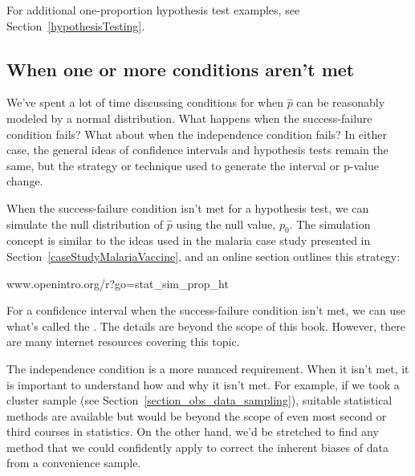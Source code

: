 \oneprophtsummary{}


\noindent%
For additional one-proportion hypothesis test examples,
see Section~\ref{hypothesisTesting}.




\D{\newpage}

\subsection{When one or more conditions aren't met}

We've spent a lot of time discussing conditions for when
$\hat{p}$ can be reasonably modeled by a normal distribution.
What happens when the success-failure condition fails?
What about when the independence condition fails?
In either case, the general ideas of confidence intervals
and hypothesis tests remain the same, but the strategy
or technique used to generate the interval or p-value
change.

When the success-failure condition isn't met
for a hypothesis test, we can simulate the null distribution
of $\hat{p}$ using the null value, $p_0$.
The simulation concept is similar to the ideas used
in the malaria case study presented in
Section~\ref{caseStudyMalariaVaccine},
and an online section outlines this strategy:
\begin{center}
    {www.openintro.org/r?go=stat\_sim\_prop\_ht}
\end{center}
For a confidence interval when the success-failure condition
isn't met, we can use what's called
the .
The details are beyond the scope of this book.
However, there are many internet resources covering
this topic.

The independence condition is a more nuanced requirement.
When it isn't met, it is important to understand how and why
it isn't met.
For example, if we took a cluster sample
(see Section~\ref{section_obs_data_sampling}),
suitable statistical methods are available but would
be beyond the scope of even most second or third courses
in statistics.
On the other hand, we'd be stretched to find any method
that we could confidently apply to correct the inherent biases
of data from a convenience sample.

